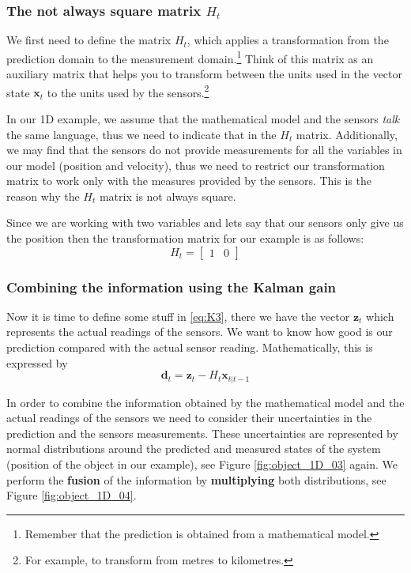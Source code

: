 \documentclass[12pt,a4paper,final]{article} %
\newcommand{\vect}[1]{\mathbf{#1}}
\begin{document}
\subsubsection{The not always square matrix $H_t$}
We first need to define the matrix $H_t$, which applies a
transformation from the prediction domain to the measurement
domain.\footnote{Remember that the prediction is obtained from a
  mathematical model.} Think of this matrix as an auxiliary matrix
that helps you to transform between the units used in the vector state
$\vect{x}_t$ to the units used by the sensors.\footnote{For example,
  to transform from metres to kilometres.}

In our 1D example, we assume that the mathematical model and the
sensors \textit{talk} the same language, thus we need to indicate that
in the $H_t$ matrix. Additionally, we may find that the sensors do not
provide measurements for all the variables in our model (position and
velocity), thus we need to restrict our transformation matrix to work
only with the measures provided by the sensors. This is the reason why
the $H_t$ matrix is not always square.

Since we are working with two variables and lets say that our sensors
only give us the position then the transformation matrix for our
example is as follows:
\begin{equation}
  \label{eq:transformation_matrix}
  H_t = 
  \begin{bmatrix}
    1 & 0
  \end{bmatrix}
\end{equation}

\subsubsection{Combining the information using the Kalman gain}
Now it is time to define some stuff in \eqref{eq:K3}, there we have
the vector $\vect{z}_t$ which represents the actual readings of the
sensors. We want to know how good is our prediction compared with the
actual sensor reading. Mathematically, this is expressed by
\begin{equation}
  \label{eq:diff_sensor_prediction}
  \vect{d}_t = \vect{z}_t - H_t \vect{x}_{t|t-1}
\end{equation}

In order to combine the information obtained by the mathematical model
and the actual readings of the sensors we need to consider their
uncertainties in the prediction and the sensors measurements. These
uncertainties are represented by normal distributions around the
predicted and measured states of the system (position of the object in
our example), see Figure \ref{fig:object_1D_03} again. We perform the
\textbf{fusion} of the information by \textbf{multiplying} both
distributions, see Figure \ref{fig:object_1D_04}.
\end{document}
